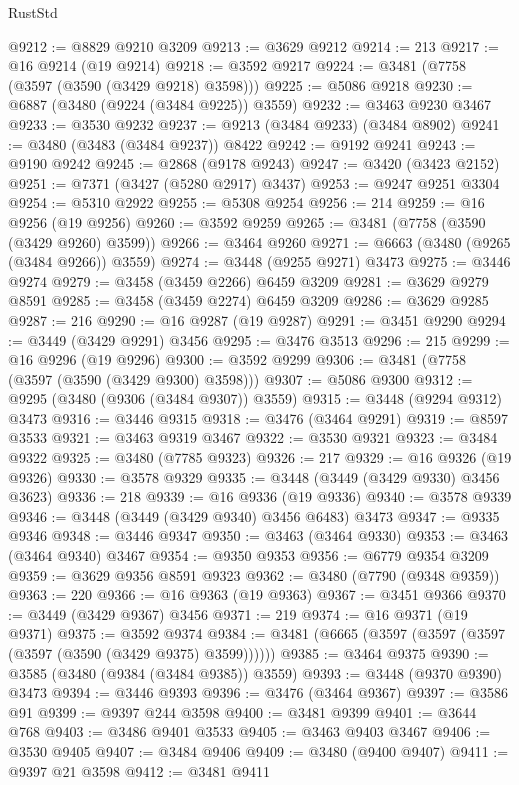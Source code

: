 \begin{lexlean}{RustStd}
\begin{coremodule}
{{{{{{{{{{{{{{{{{{{@9212 := @8829 @9210 @3209
@9213 := @3629 @9212
@9214 := 213
@9217 := @16 @9214 (@19 @9214)
@9218 := @3592 @9217
@9224 := @3481 (@7758 (@3597 (@3590 (@3429 @9218) @3598)))
@9225 := @5086 @9218
@9230 := @6887 (@3480 (@9224 (@3484 @9225)) @3559)
@9232 := @3463 @9230 @3467
@9233 := @3530 @9232
@9237 := @9213 (@3484 @9233) (@3484 @8902)
@9241 := @3480 (@3483 (@3484 @9237)) @8422
@9242 := @9192 @9241
@9243 := @9190 @9242
@9245 := @2868 (@9178 @9243)
@9247 := @3420 (@3423 @2152)
@9251 := @7371 (@3427 (@5280 @2917) @3437)
@9253 := @9247 @9251 @3304
@9254 := @5310 @2922
@9255 := @5308 @9254
@9256 := 214
@9259 := @16 @9256 (@19 @9256)
@9260 := @3592 @9259
@9265 := @3481 (@7758 (@3590 (@3429 @9260) @3599))
@9266 := @3464 @9260
@9271 := @6663 (@3480 (@9265 (@3484 @9266)) @3559)
@9274 := @3448 (@9255 @9271) @3473
@9275 := @3446 @9274
@9279 := @3458 (@3459 @2266) @6459 @3209
@9281 := @3629 @9279 @8591
@9285 := @3458 (@3459 @2274) @6459 @3209
@9286 := @3629 @9285
@9287 := 216
@9290 := @16 @9287 (@19 @9287)
@9291 := @3451 @9290
@9294 := @3449 (@3429 @9291) @3456
@9295 := @3476 @3513
@9296 := 215
@9299 := @16 @9296 (@19 @9296)
@9300 := @3592 @9299
@9306 := @3481 (@7758 (@3597 (@3590 (@3429 @9300) @3598)))
@9307 := @5086 @9300
@9312 := @9295 (@3480 (@9306 (@3484 @9307)) @3559)
@9315 := @3448 (@9294 @9312) @3473
@9316 := @3446 @9315
@9318 := @3476 (@3464 @9291)
@9319 := @8597 @3533
@9321 := @3463 @9319 @3467
@9322 := @3530 @9321
@9323 := @3484 @9322
@9325 := @3480 (@7785 @9323)
@9326 := 217
@9329 := @16 @9326 (@19 @9326)
@9330 := @3578 @9329
@9335 := @3448 (@3449 (@3429 @9330) @3456 @3623)
@9336 := 218
@9339 := @16 @9336 (@19 @9336)
@9340 := @3578 @9339
@9346 := @3448 (@3449 (@3429 @9340) @3456 @6483) @3473
@9347 := @9335 @9346
@9348 := @3446 @9347
@9350 := @3463 (@3464 @9330)
@9353 := @3463 (@3464 @9340) @3467
@9354 := @9350 @9353
@9356 := @6779 @9354 @3209
@9359 := @3629 @9356 @8591 @9323
@9362 := @3480 (@7790 (@9348 @9359))
@9363 := 220
@9366 := @16 @9363 (@19 @9363)
@9367 := @3451 @9366
@9370 := @3449 (@3429 @9367) @3456
@9371 := 219
@9374 := @16 @9371 (@19 @9371)
@9375 := @3592 @9374
@9384 := @3481 (@6665 (@3597 (@3597 (@3597 (@3597 (@3590 (@3429 @9375) @3599))))))
@9385 := @3464 @9375
@9390 := @3585 (@3480 (@9384 (@3484 @9385)) @3559)
@9393 := @3448 (@9370 @9390) @3473
@9394 := @3446 @9393
@9396 := @3476 (@3464 @9367)
@9397 := @3586 @91
@9399 := @9397 @244 @3598
@9400 := @3481 @9399
@9401 := @3644 @768
@9403 := @3486 @9401 @3533
@9405 := @3463 @9403 @3467
@9406 := @3530 @9405
@9407 := @3484 @9406
@9409 := @3480 (@9400 @9407)
@9411 := @9397 @21 @3598
@9412 := @3481 @9411
}}}}}}}}}}}}}}}}}}}
\end{coremodule}
\end{lexlean}

